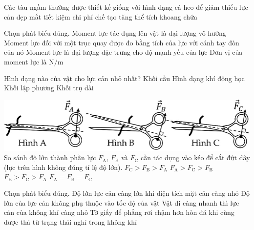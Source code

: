 \begin{ex}
	Các tàu ngầm thường được thiết kế giống với hình dạng cá heo để
	\choice
	{\True giảm thiểu lực cản}
	{đẹp mắt}
	{tiết kiệm chi phí chế tạo}
	{tăng thể tích khoang chứa}
	\loigiai{}
\end{ex}
\begin{ex}
	Chọn phát biểu đúng.
	\choice
	{Moment lực tác dụng lên vật là đại lượng vô hướng}
	{\True Moment lực đối với một trục quay được đo bằng tích của lực với cánh tay đòn của nó}
	{Moment lực là đại lượng đặc trưng cho độ mạnh yếu của lực}
	{Đơn vị của moment lực là $\si{\newton/\meter}$}
	\loigiai{}
\end{ex}
\begin{ex}
	Hình dạng nào của vật cho lực cản nhỏ nhất?
	\choice
	{Khối cầu}
	{\True Hình dạng khí động học}
	{Khối lập phương}
	{Khối trụ dài}
	\loigiai{}
\end{ex}
\begin{ex}
	{\includegraphics[scale=0.6]{../figs/D10-KTTX3-001-4}}
	So sánh độ lớn thành phần lực $F_\mathrm{A}$, $F_\mathrm{B}$ và $F_\mathrm{C}$ cần tác dụng vào kéo để cắt đứt dây (lực trên hình không đúng tỉ lệ độ lớn).
	\choice
	{$F_{\mathrm{C}}>F_{\mathrm{B}}>F_{\mathrm{A}}$}
	{\True $F_{\mathrm{A}}>F_{\mathrm{C}}>F_{\mathrm{B}}$}
	{$F_{\mathrm{B}}>F_{\mathrm{C}}>F_{\mathrm{A}}$}
	{$F_{\mathrm{A}}=F_{\mathrm{B}}=F_{\mathrm{C}}$}
	\loigiai{}
\end{ex}
\begin{ex}
	Chọn phát biểu đúng.
	\choice
	{Độ lớn lực cản càng lớn khi diện tích mặt cản càng nhỏ}
	{Độ lớn của lực cản không phụ thuộc vào tốc độ của vật}
	{Vật đi càng nhanh thì lực cản của không khí càng nhỏ}
	{\True Tờ giấy để phẳng rơi chậm hơn hòn đá khi cùng được thả từ trạng thái nghỉ trong không khí}
	\loigiai{}
\end{ex}


